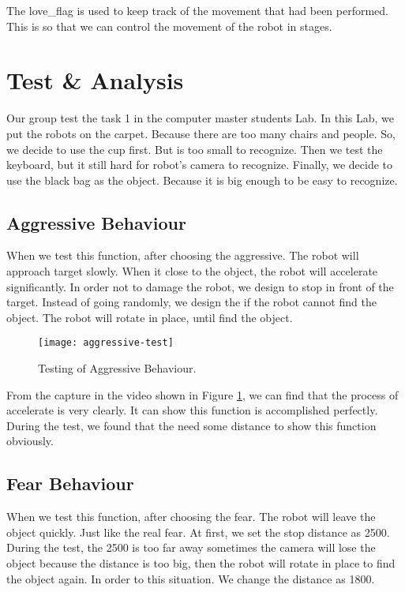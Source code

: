 The love\_flag is used to keep track of the movement that had been performed. This is so that we can control the movement of the robot in stages.

\section{Test \& Analysis}

Our group test the task 1 in the computer master students Lab. In this Lab, we put the robots on the carpet. Because there are too many chairs and people. So, we decide to use the cup first. But is too small to recognize. Then we test the keyboard, but it still hard for robot’s camera to recognize. Finally, we decide to use the black bag as the object. Because it is big enough to be easy to recognize.


\subsection{Aggressive Behaviour}

When we test this function, after choosing the aggressive. The robot will approach target slowly. When it close to the object, the robot will accelerate significantly. In order not to damage the robot, we design to stop in front of the target. Instead of going randomly, we design the if the robot cannot find the object. The robot will rotate in place, until find the object.

\begin{figure}
\centering
\texttt{[image: aggressive-test]}
\caption{Testing of Aggressive Behaviour.}
\label{fig:aggressive-test}
\end{figure}

From the capture in the video shown in Figure \ref{fig:aggressive-test}, we can find that the process of accelerate is very clearly. It can show this function is accomplished perfectly. During the test, we found that the need some distance to show this function obviously. 

\subsection{Fear Behaviour}

When we test this function, after choosing the fear. The robot will leave the object quickly. Just like the real fear. At first, we set the stop distance as 2500. During the test, the 2500 is too far away sometimes the camera will lose the object because the distance is too big, then the robot will rotate in place to find the object again. In order to this situation. We change the distance as 1800. 

